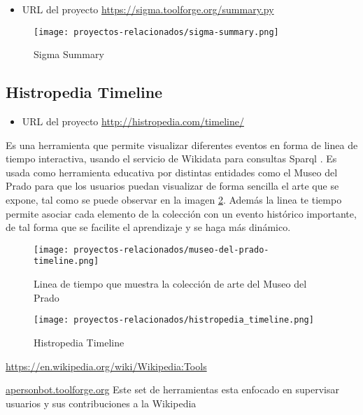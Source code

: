 \begin{itemize}
    \item URL del proyecto \url{https://sigma.toolforge.org/summary.py}
\end{itemize}

\begin{figure}[H]
    \centering
    \texttt{[image: proyectos-relacionados/sigma-summary.png]}
    \caption{Sigma Summary}
    \label{fig:sigma_summary}
\end{figure}

\subsection{Histropedia Timeline}

\begin{itemize}
    \item URL del proyecto \url{http://histropedia.com/timeline/}
\end{itemize}

Es una herramienta que permite visualizar diferentes eventos en forma de linea de tiempo interactiva, usando el servicio de Wikidata para consultas Sparql \cite{WikidataSparql}. Es usada como herramienta educativa por distintas entidades como el Museo del Prado para que los usuarios puedan visualizar de forma sencilla el arte que se expone, tal como se puede observar en la imagen \ref{fig:museo-de-prado-timeline}. Además la linea te tiempo permite asociar cada elemento de la colección con un evento histórico importante, de tal forma que se facilite el aprendizaje y se haga más dinámico.

\begin{figure}[H]
    \centering
    \texttt{[image: proyectos-relacionados/museo-del-prado-timeline.png]}
    \caption{Linea de tiempo que muestra la colección de arte del Museo del Prado}
    \label{fig:museo-de-prado-timeline}
\end{figure}



\begin{figure}[H]
    \centering
    \texttt{[image: proyectos-relacionados/histropedia\_timeline.png]}
    \caption{Histropedia Timeline}
    \label{fig:histropedia_timeline}
\end{figure}


\url{https://en.wikipedia.org/wiki/Wikipedia:Tools}

\url{apersonbot.toolforge.org}
Este set de herramientas esta enfocado en supervisar usuarios y sus contribuciones a la Wikipedia

